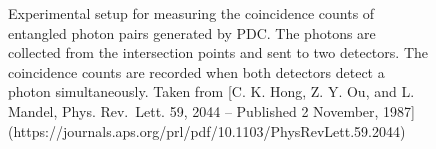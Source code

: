 \documentclass[
  a4paper,
]{book}
\begin{document}
\begin{figure}


\caption{\label{fig-pdc3}Experimental setup for measuring the
coincidence counts of entangled photon pairs generated by PDC. The
photons are collected from the intersection points and sent to two
detectors. The coincidence counts are recorded when both detectors
detect a photon simultaneously. Taken from {[}C. K. Hong, Z. Y. Ou, and
L. Mandel, Phys. Rev.~Lett. 59, 2044 -- Published 2 November, 1987{]}
(https://journals.aps.org/prl/pdf/10.1103/PhysRevLett.59.2044)}

\end{figure}%
\end{document}
